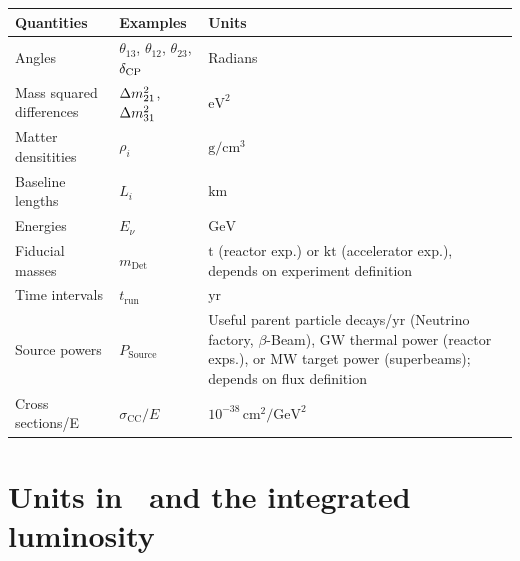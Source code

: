 \begin{table}[tb]
\begin{center}
\begin{tabular}{llp{7cm}}
\hline
Quantities & Examples & Units \\
\hline
Angles & $\theta_{13}$, $\theta_{12}$, $\theta_{23}$, $\delta_{\mathrm{CP}}$ & Radians  \\
Mass squared differences & $\Delta m_{21}^2$, $\Delta m_{31}^2$ & $\mathrm{eV}^2$ \\
Matter densitities & $\rho_i$ & $\mathrm{g}/\mathrm{cm}^3$ \\
Baseline lengths & $L_i$ & $\mathrm{km}$ \\
Energies & $E_\nu$ & $\mathrm{GeV}$ \\  
Fiducial masses & $m_{\mathrm{Det}}$ & $\mathrm{t}$ (reactor exp.) or $\mathrm{kt}$ (accelerator exp.), \newline  depends on experiment definition \\
Time intervals & $t_{\mathrm{run}}$ & $\mathrm{yr}$ \\
Source powers & $P_{\mathrm{Source}}$ & Useful parent particle decays/$\mathrm{yr}$ \newline (Neutrino factory, $\beta$-Beam), \newline $\mathrm{GW}$ thermal power (reactor exps.), \newline or
$\mathrm{MW}$ target power (superbeams); \newline
depends on flux definition
 \\
Cross sections/E & $\sigma_{\mathrm{CC}}/E$ & $10^{-38} \, \mathrm{cm^2}/\mathrm{GeV^2}$ \\
\hline
\end{tabular}
\end{center}
\end{table}

\section{Units in \GLOBES\ and the integrated luminosity}
\label{sec:luminosity}

